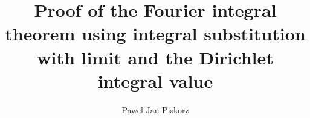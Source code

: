 \documentclass[12pt]{article}
\numberwithin{equation}{section}
\begin{document}



\title{Proof of the Fourier integral theorem using integral substitution with limit and the Dirichlet integral value}






\author{Pawel Jan Piskorz}

\date{}


\maketitle














\end{document}

